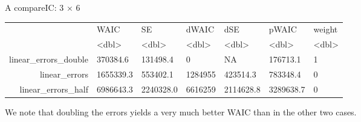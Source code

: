 \documentclass[11pt]{article}
\begin{document}
    A compareIC: 3 × 6
\begin{tabular}{r|llllll}
  & WAIC & SE & dWAIC & dSE & pWAIC & weight\\
  & <dbl> & <dbl> & <dbl> & <dbl> & <dbl> & <dbl>\\
\hline
	linear\_errors\_double &  370384.6 &  131498.4 &       0 &        NA &  176713.1 & 1\\
	linear\_errors & 1655339.3 &  553402.1 & 1284955 &  423514.3 &  783348.4 & 0\\
	linear\_errors\_half & 6986643.3 & 2240328.0 & 6616259 & 2114628.8 & 3289638.7 & 0\\
\end{tabular}


    
    We note that doubling the errors yields a very much better WAIC than in
the other two cases.


    
    
    
\end{document}
